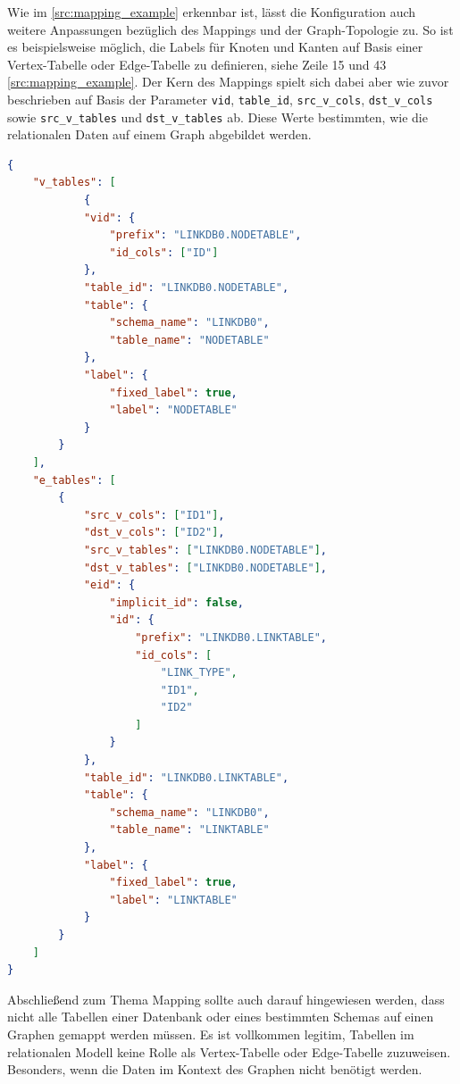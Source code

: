 Wie im \autoref{src:mapping_example} erkennbar ist, lässt die Konfiguration auch weitere Anpassungen bezüglich des Mappings und der Graph-Topologie zu. So ist es beispielsweise möglich, die Labels für Knoten und Kanten auf Basis einer Vertex-Tabelle oder Edge-Tabelle zu definieren, siehe Zeile 15 und 43 \autoref{src:mapping_example}. Der Kern des Mappings spielt sich dabei aber wie zuvor beschrieben auf Basis der Parameter \texttt{\acs{vid}}, \texttt{table\_id}, \texttt{src\_v\_cols}, \texttt{dst\_v\_cols} sowie \texttt{src\_v\_tables} und \texttt{dst\_v\_tables} ab. Diese Werte bestimmten, wie die relationalen Daten auf einem Graph abgebildet werden.

\begin{lstlisting}[caption={Beispiel Auschnitt Mapping Konfiguration},language=json,label=src:mapping_example]
{
    "v_tables": [
            {
            "vid": {
                "prefix": "LINKDB0.NODETABLE",
                "id_cols": ["ID"]
            },
            "table_id": "LINKDB0.NODETABLE",
            "table": {
                "schema_name": "LINKDB0",
                "table_name": "NODETABLE"
            },
            "label": {
                "fixed_label": true,
                "label": "NODETABLE"
            }
        }
    ],
    "e_tables": [
        {
            "src_v_cols": ["ID1"],
            "dst_v_cols": ["ID2"],
            "src_v_tables": ["LINKDB0.NODETABLE"],
            "dst_v_tables": ["LINKDB0.NODETABLE"],
            "eid": {
                "implicit_id": false,
                "id": {
                    "prefix": "LINKDB0.LINKTABLE",
                    "id_cols": [
                        "LINK_TYPE",
                        "ID1",
                        "ID2"
                    ]
                }
            },
            "table_id": "LINKDB0.LINKTABLE",
            "table": {
                "schema_name": "LINKDB0",
                "table_name": "LINKTABLE"
            },
            "label": {
                "fixed_label": true,
                "label": "LINKTABLE"
            }
        }
    ]
}
\end{lstlisting}

Abschließend zum Thema Mapping sollte auch darauf hingewiesen werden, dass nicht alle Tabellen einer Datenbank oder eines bestimmten Schemas auf einen Graphen gemappt werden müssen. Es ist vollkommen legitim, Tabellen im relationalen Modell keine Rolle als Vertex-Tabelle oder Edge-Tabelle zuzuweisen. Besonders, wenn die Daten im Kontext des Graphen nicht benötigt werden. 

